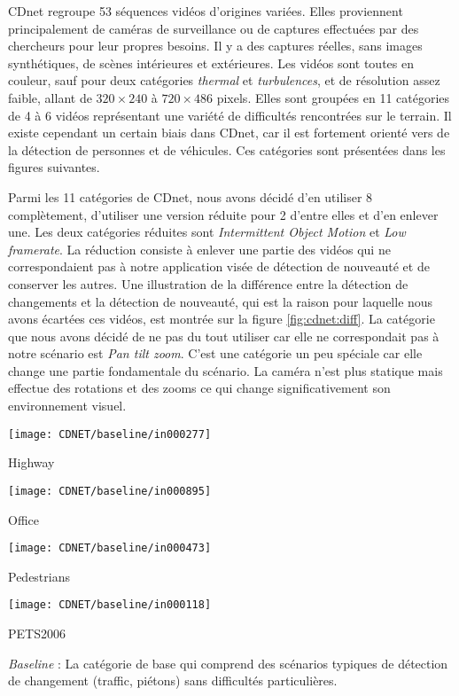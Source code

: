	CDnet regroupe 53 séquences vidéos d'origines variées. Elles proviennent principalement de caméras de surveillance ou de captures effectuées par des chercheurs pour leur propres besoins. Il y a des captures réelles, sans images synthétiques, de scènes intérieures et extérieures. Les vidéos sont toutes en couleur, sauf pour deux catégories \textit{thermal} et \textit{turbulences}, et de résolution assez faible, allant de $320 \times 240$ à $720 \times 486$ pixels. Elles sont groupées en 11 catégories de 4 à 6 vidéos représentant une variété de difficultés rencontrées sur le terrain. Il existe cependant un certain biais dans CDnet, car il est fortement orienté vers de la détection de personnes et de véhicules. Ces catégories sont présentées dans les figures suivantes.

	Parmi les 11 catégories de CDnet, nous avons décidé d'en utiliser 8 complètement, d'utiliser une version réduite pour 2 d'entre elles et d'en enlever une. Les deux catégories réduites sont \textit{Intermittent Object Motion} et \textit{Low framerate}. La réduction consiste à enlever une partie des vidéos qui ne correspondaient pas à notre application visée de détection de nouveauté et de conserver les autres. Une illustration de la différence entre la détection de changements et la détection de nouveauté, qui est la raison pour laquelle nous avons écartées ces vidéos, est montrée sur la figure \ref{fig:cdnet:diff}. La catégorie que nous avons décidé de ne pas du tout utiliser car elle ne correspondait pas à notre scénario est \textit{Pan tilt zoom}. C'est une catégorie un peu spéciale car elle change une partie fondamentale du scénario. La caméra n'est plus statique mais effectue des rotations et des zooms ce qui change significativement son environnement visuel.

	\begin{figureth}
		\begin{subfigureth}{0.24\textwidth}
			\texttt{[image: CDNET/baseline/in000277]}\caption{Highway}	
		\end{subfigureth}
		\begin{subfigureth}{0.24\textwidth}
			\texttt{[image: CDNET/baseline/in000895]}\caption{Office}	
		\end{subfigureth}
		\begin{subfigureth}{0.24\textwidth}
			\texttt{[image: CDNET/baseline/in000473]}\caption{Pedestrians}	
		\end{subfigureth}
		\begin{subfigureth}{0.24\textwidth}
			\texttt{[image: CDNET/baseline/in000118]}\caption{PETS2006}	
		\end{subfigureth}
		\caption[Catégorie Baseline]{\textit{Baseline} : La catégorie de base qui comprend des scénarios typiques de détection de changement (traffic, piétons) sans difficultés particulières.}\label{fig:cdnet:baseline}
	\end{figureth}

